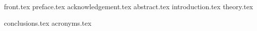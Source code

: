 \documentclass[12pt,twoside,openright,final]{report}
\begin{document}
{front.tex}
\setcounter{page}{0}
{preface.tex}
{acknowledgement.tex}
{abstract.tex}
\listoftodos %
\tableofcontents
\setcounter{page}{0}
{introduction.tex}
{theory.tex}



{conclusions.tex}
\appendix
{acronyms.tex}


\printbibliography
{}
\end{document}
